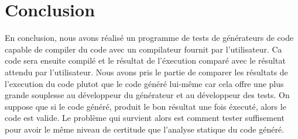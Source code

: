 \chapter*{Conclusion}

En conclusion, nous avons réalisé un programme de tests de générateurs de code capable de compiler du code avec un compilateur fournit par l'utilisateur.
Ca code sera ensuite compilé et le résultat de l'éxecution comparé avec le résultat attendu par l'utilisateur. Nous avons pris le partie de
comparer les résultats de l'execution du code plutot que le code généré lui-même car cela offre une plus grande souplesse au développeur
du générateur et au développeur des tests. On suppose que si le code généré, produit le bon résultat une fois éxecuté, alors le code est valide.
Le problème qui survient alors est comment tester suffisement pour avoir le même niveau de certitude que l'analyse statique du code généré. 
